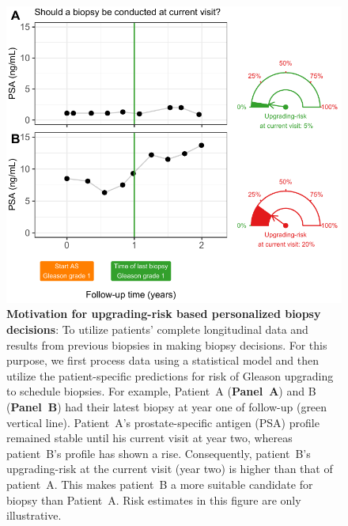 \begin{figure}
\centerline{\includegraphics{contents/c5/images/c5_fig2.pdf}}
\caption{\textbf{Motivation for upgrading-risk based personalized biopsy decisions}: To utilize patients' complete longitudinal data and results from previous biopsies in making biopsy decisions. For this purpose, we first process data using a statistical model and then utilize the patient-specific predictions for risk of Gleason upgrading to schedule biopsies. For example, Patient~A (\textbf{Panel~A}) and B (\textbf{Panel~B}) had their latest biopsy at year one of follow-up (green vertical line). Patient~A's prostate-specific antigen (PSA) profile remained stable until his current visit at year two, whereas patient~B's profile has shown a rise. Consequently, patient~B's upgrading-risk at the current visit (year two) is higher than that of patient~A. This makes patient~B a more suitable candidate for biopsy than Patient~A. Risk estimates in this figure are only illustrative.}
\label{c5:fig:2}
\end{figure}


